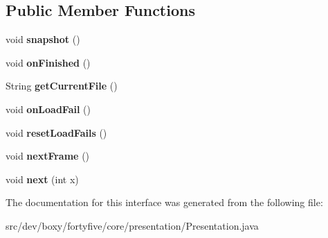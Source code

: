 \subsection*{Public Member Functions}
\begin{DoxyCompactItemize}
\item 
\hypertarget{interfacedev_1_1boxy_1_1fortyfive_1_1core_1_1presentation_1_1_presentation_a78257ff3d9c8d1d3f6c3d1e11e969e1c}{
void {\bfseries snapshot} ()}
\label{d3/de3/interfacedev_1_1boxy_1_1fortyfive_1_1core_1_1presentation_1_1_presentation_a78257ff3d9c8d1d3f6c3d1e11e969e1c}

\item 
\hypertarget{interfacedev_1_1boxy_1_1fortyfive_1_1core_1_1presentation_1_1_presentation_a4e65374e4a3cd15e412bb5d865e2a1c6}{
void {\bfseries onFinished} ()}
\label{d3/de3/interfacedev_1_1boxy_1_1fortyfive_1_1core_1_1presentation_1_1_presentation_a4e65374e4a3cd15e412bb5d865e2a1c6}

\item 
\hypertarget{interfacedev_1_1boxy_1_1fortyfive_1_1core_1_1presentation_1_1_presentation_ab6dc159fca953edfe146c7a1762cbd39}{
String {\bfseries getCurrentFile} ()}
\label{d3/de3/interfacedev_1_1boxy_1_1fortyfive_1_1core_1_1presentation_1_1_presentation_ab6dc159fca953edfe146c7a1762cbd39}

\item 
\hypertarget{interfacedev_1_1boxy_1_1fortyfive_1_1core_1_1presentation_1_1_presentation_aa58794961d4582c68b56d34850fb24db}{
void {\bfseries onLoadFail} ()}
\label{d3/de3/interfacedev_1_1boxy_1_1fortyfive_1_1core_1_1presentation_1_1_presentation_aa58794961d4582c68b56d34850fb24db}

\item 
\hypertarget{interfacedev_1_1boxy_1_1fortyfive_1_1core_1_1presentation_1_1_presentation_a04e405acfc96bd7b179089e6bd4c7aa1}{
void {\bfseries resetLoadFails} ()}
\label{d3/de3/interfacedev_1_1boxy_1_1fortyfive_1_1core_1_1presentation_1_1_presentation_a04e405acfc96bd7b179089e6bd4c7aa1}

\item 
\hypertarget{interfacedev_1_1boxy_1_1fortyfive_1_1core_1_1presentation_1_1_presentation_a28d25efdaee306174d107a85c7f70e09}{
void {\bfseries nextFrame} ()}
\label{d3/de3/interfacedev_1_1boxy_1_1fortyfive_1_1core_1_1presentation_1_1_presentation_a28d25efdaee306174d107a85c7f70e09}

\item 
\hypertarget{interfacedev_1_1boxy_1_1fortyfive_1_1core_1_1presentation_1_1_presentation_a1ecdd3d504030cf2a4ad592c1762e007}{
void {\bfseries next} (int x)}
\label{d3/de3/interfacedev_1_1boxy_1_1fortyfive_1_1core_1_1presentation_1_1_presentation_a1ecdd3d504030cf2a4ad592c1762e007}

\end{DoxyCompactItemize}


The documentation for this interface was generated from the following file:\begin{DoxyCompactItemize}
\item 
src/dev/boxy/fortyfive/core/presentation/Presentation.java\end{DoxyCompactItemize}
